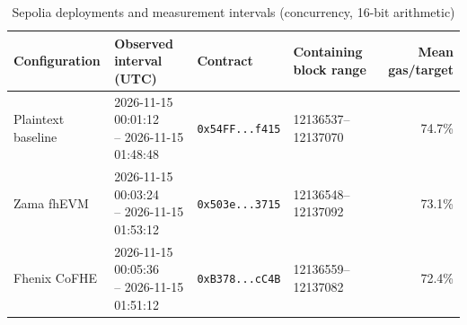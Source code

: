 \begin{table}[!t]
\caption{Sepolia deployments and measurement intervals (concurrency, 16-bit arithmetic)}
\label{tab:sepolia-concurrency-deployments}
\centering
\footnotesize
\setlength{\tabcolsep}{4pt}
\begin{tabular}{|l|l|l|l|r|}
\hline
\textbf{Configuration} & \textbf{Observed interval (UTC)} & \textbf{Contract} & \textbf{Containing block range} & \textbf{Mean gas/target} \\
\hline
Plaintext baseline & \shortstack[l]{2026-11-15 00:01:12 \\ -- 2026-11-15 01:48:48} & \texttt{0x54FF...f415} & 12136537--12137070 & 74.7\% \\
\hline
Zama fhEVM & \shortstack[l]{2026-11-15 00:03:24 \\ -- 2026-11-15 01:53:12} & \texttt{0x503e...3715} & 12136548--12137092 & 73.1\% \\
\hline
Fhenix CoFHE & \shortstack[l]{2026-11-15 00:05:36 \\ -- 2026-11-15 01:51:12} & \texttt{0xB378...cC4B} & 12136559--12137082 & 72.4\% \\
\hline
\end{tabular}
\end{table}
